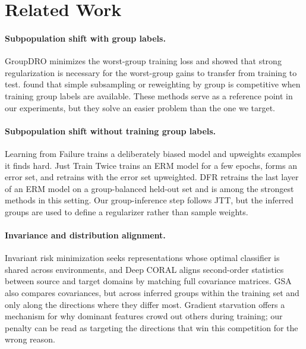 \documentclass{article}
\begin{document}
\section{Related Work}
\label{sec:related}

\paragraph{Subpopulation shift with group labels.}
GroupDRO \citep{sagawa2020groupdro} minimizes the worst-group training loss and showed that strong regularization is necessary for the worst-group gains to transfer from training to test. \citet{idrissi2022simple} found that simple subsampling or reweighting by group is competitive when training group labels are available. These methods serve as a reference point in our experiments, but they solve an easier problem than the one we target.

\paragraph{Subpopulation shift without training group labels.}
Learning from Failure \citep{nam2020lff} trains a deliberately biased model and upweights examples it finds hard. Just Train Twice \citep{liu2021jtt} trains an ERM model for a few epochs, forms an error set, and retrains with the error set upweighted. DFR \citep{kirichenko2023dfr} retrains the last layer of an ERM model on a group-balanced held-out set and is among the strongest methods in this setting. Our group-inference step follows JTT, but the inferred groups are used to define a regularizer rather than sample weights.

\paragraph{Invariance and distribution alignment.}
Invariant risk minimization \citep{arjovsky2019irm} seeks representations whose optimal classifier is shared across environments, and Deep CORAL \citep{sun2016coral} aligns second-order statistics between source and target domains by matching full covariance matrices. GSA also compares covariances, but across inferred groups within the training set and only along the directions where they differ most. Gradient starvation \citep{pezeshki2021gradient} offers a mechanism for why dominant features crowd out others during training; our penalty can be read as targeting the directions that win this competition for the wrong reason.
\end{document}
